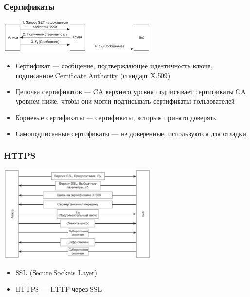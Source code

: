 \documentclass{../../slides-style}
\begin{document}
    \begin{frame}
        \frametitle{Сертификаты}
        \begin{center}
            \includegraphics[width=0.6\textwidth]{manInTheMiddle.png}
        \end{center}
        \begin{itemize}
            \item Сертификат --- сообщение, подтверждающее идентичность ключа, подписанное Certificate Authority (стандарт X.509)
            \item Цепочка сертификатов --- CA верхнего уровня подписывает сертификаты CA уровнем ниже, чтобы они могли подписывать сертификаты пользователей
            \item Корневые сертификаты --- сертификаты, которым принято доверять
            \item Самоподписанные сертификаты --- не доверенные, используются для отладки
        \end{itemize}
    \end{frame}

    \begin{frame}
        \frametitle{HTTPS}
        \begin{center}
            \includegraphics[width=0.6\textwidth]{ssl.png}
        \end{center}
        \begin{itemize}
            \item SSL (Secure Sockets Layer)
            \item HTTPS --- HTTP через SSL
        \end{itemize}
    \end{frame}
\end{document}

